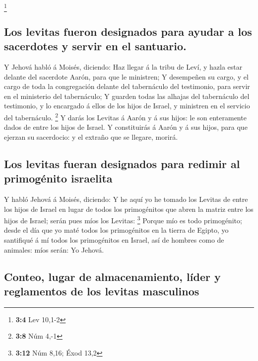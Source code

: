 \footnote{\textbf{3:4} Lev 10,1-2}

\hypertarget{los-levitas-fueron-designados-para-ayudar-a-los-sacerdotes-y-servir-en-el-santuario.}{%
\subsection{Los levitas fueron designados para ayudar a los sacerdotes y
servir en el
santuario.}\label{los-levitas-fueron-designados-para-ayudar-a-los-sacerdotes-y-servir-en-el-santuario.}}

 Y Jehová habló á Moisés, diciendo:  Haz
llegar á la tribu de Leví, y hazla estar delante del sacerdote Aarón,
para que le ministren;  Y desempeñen su cargo, y el cargo
de toda la congregación delante del tabernáculo del testimonio, para
servir en el ministerio del tabernáculo;  Y guarden todas
las alhajas del tabernáculo del testimonio, y lo encargado á ellos de
los hijos de Israel, y ministren en el servicio del tabernáculo.
\footnote{\textbf{3:8} Núm 4,-1}  Y darás los Levitas á
Aarón y á sus hijos: le son enteramente dados de entre los hijos de
Israel.  Y constituirás á Aarón y á sus hijos, para que
ejerzan su sacerdocio: y el extraño que se llegare, morirá.

\hypertarget{los-levitas-fueran-designados-para-redimir-al-primoguxe9nito-israelita}{%
\subsection{Los levitas fueran designados para redimir al primogénito
israelita}\label{los-levitas-fueran-designados-para-redimir-al-primoguxe9nito-israelita}}

 Y habló Jehová á Moisés, diciendo:  Y he
aquí yo he tomado los Levitas de entre los hijos de Israel en lugar de
todos los primogénitos que abren la matriz entre los hijos de Israel;
serán pues míos los Levitas: \footnote{\textbf{3:12} Núm 8,16; Éxod 13,2}
 Porque mío es todo primogénito; desde el día que yo maté
todos los primogénitos en la tierra de Egipto, yo santifiqué á mí todos
los primogénitos en Israel, así de hombres como de animales: míos serán:
Yo Jehová.

\hypertarget{conteo-lugar-de-almacenamiento-luxedder-y-reglamentos-de-los-levitas-masculinos}{%
\subsection{Conteo, lugar de almacenamiento, líder y reglamentos de los
levitas
masculinos}\label{conteo-lugar-de-almacenamiento-luxedder-y-reglamentos-de-los-levitas-masculinos}}

